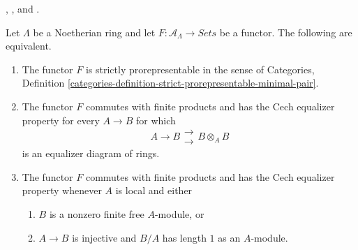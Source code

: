 \begin{theorem}
\label{theorem-grothendieck-levelt-prorepresentability}
\begin{reference}
\cite[Expos\'e 195, B, Th\'eor\`eme 1, pp. 377--378]{FGA},
\cite[Section 4, Proposition 2, pp. 135--140]{Levelt-left-exact}, and
\cite[pp. 1--3]{Levelt-left-exact-correction}.
\end{reference}
Let $\Lambda$ be a Noetherian ring and let
$F : \mathcal{A}_\Lambda \to \textit{Sets}$ be a functor. The following are
equivalent.
\begin{enumerate}
\item The functor $F$ is strictly prorepresentable in the sense of Categories,
Definition
\ref{categories-definition-strict-prorepresentable-minimal-pair}.
\item The functor $F$ commutes with finite products and has the Cech equalizer
property for every $A \to B$ for which
$$
A \longrightarrow B
\mathrel{\substack{\longrightarrow \\[-0.6ex] \longrightarrow}}
B \otimes_A B
$$
is an equalizer diagram of rings.
\item The functor $F$ commutes with finite products and has the Cech equalizer
property whenever $A$ is local and either
\begin{enumerate}
\item $B$ is a nonzero finite free $A$-module, or
\item $A \to B$ is injective and $B/A$ has length $1$ as an $A$-module.
\end{enumerate}
\end{enumerate}
\end{theorem}

